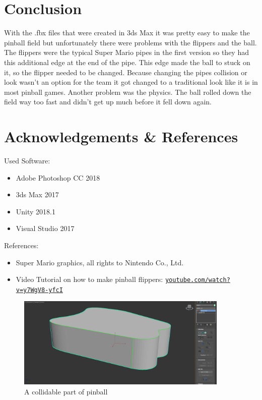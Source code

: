 \documentclass[11.5pt,oneside,a4paper]{scrartcl}
\newcounter{ct}
\begin{document}
\section{Conclusion}
With the .fbx files that were created in 3ds Max it was pretty easy to make the pinball field but unfortunately there were problems with the flippers and the ball.
The flippers were the typical Super Mario pipes in the first version so they had this additional edge at the end of the pipe. This edge made the ball to stuck on it, so the flipper needed to be changed. Because changing the pipes collision or look wasn't an option for the team it got changed to a traditional look like it is in most pinball games.
Another problem was the physics. The ball rolled down the field way too fast and didn't get up much before it fell down again.

\section{Acknowledgements \& References}
Used Software:
\begin{itemize}
\item Adobe Photoshop CC 2018
\item 3ds Max 2017
\item Unity 2018.1
\item Visual Studio 2017
\end{itemize}

References:
\begin{itemize}
\item Super Mario graphics, all rights to Nintendo Co., Ltd.
\item Video Tutorial on how to make pinball flippers: \href{https://www.youtube.com/watch?v=y7WgV8-yfcI}{\nolinkurl{youtube.com/watch?v=y7WgV8-yfcI}}
\end{itemize}


\begin{figure}
	\centering
	\includegraphics[width=0.90\textwidth]{3dmodel.jpg}
	\caption{A collidable part of pinball}
	\label{fig:3dmodel}
	\vspace{0.1cm}
\end{figure}
\end{document}
